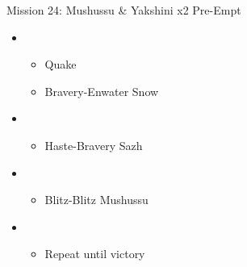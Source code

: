 \begin{multicols}{2}
  \begin{battle}{Mission 24: Mushussu \& Yakshini x2 Pre-Empt}
    \begin{itemize}
      \item \first
            \begin{itemize}
              \item Quake
              \item Bravery-Enwater Snow
            \end{itemize}
      \item \fifth
            \begin{itemize}
              \item Haste-Bravery Sazh
            \end{itemize}
      \item \fourth
            \begin{itemize}
              \item Blitz-Blitz Mushussu
            \end{itemize}
      \item \sixth
            \begin{itemize}
              \item Repeat until victory
            \end{itemize}
    \end{itemize}
  \end{battle}


\end{multicols}
